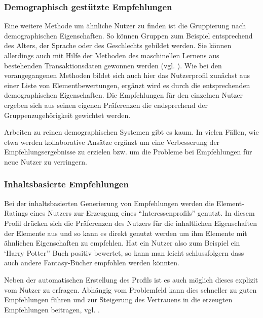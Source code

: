 \subsubsection{Demographisch gestützte Empfehlungen}
Eine weitere Methode um ähnliche Nutzer zu finden ist die Gruppierung nach demographischen Eigenschaften. So können Gruppen zum Beispiel entsprechend des Alters, der Sprache oder des Geschlechts gebildet werden. Sie können allerdings auch mit Hilfe der Methoden des maschinellen Lernens aus bestehenden Transaktionsdaten gewonnen werden (vgl. \citep{Burke:2002:HRS:586321.586352}). Wie bei den vorangegangenen Methoden bildet sich auch hier das Nutzerprofil zunächst aus einer Liste von Elementbewertungen, ergänzt wird es durch die entsprechenden demographischen Eigenschaften. Die Empfehlungen für den einzelnen Nutzer ergeben sich aus seinen eigenen Präferenzen die endsprechend der Gruppenzugehörigkeit gewichtet werden.

Arbeiten zu reinen demographischen Systemen gibt es kaum. In vielen Fällen, wie etwa \citep{Vozalis:2007:USD:1243505.1243639} werden kollaborative Ansätze ergänzt  um eine Verbesserung der Empfehlungsergebnisse zu erzielen bzw. um die Probleme bei Empfehlungen für neue Nutzer zu verringern. \citep{Burke:2002:HRS:586321.586352}

\subsubsection{Inhaltsbasierte Empfehlungen}
Bei der inhaltsbasierten Generierung von Empfehlungen werden die Element-Ratings eines Nutzers zur Erzeugung eines ``Interessenprofils'' genutzt. In diesem Profil drücken sich die Präferenzen des Nutzers für die inhaltlichen Eigenschaften der Elemente aus und so kann es direkt genutzt werden um ihm Elemente mit ähnlichen Eigenschaften zu empfehlen. Hat ein Nutzer also zum Beispiel ein `Harry Potter'' Buch positiv bewertet, so kann man leicht schlussfolgern dass auch andere Fantasy-Bücher empfohlen werden könnten.

Neben der automatischen Erstellung des Profils ist es auch möglich dieses explizit vom Nutzer zu erfragen. Abhängig vom Problemfeld kann dies schneller zu guten Empfehlungen führen und zur Steigerung des Vertrauens in die erzeugten Empfehlungen beitragen, vgl. \citep{hb_20}.

